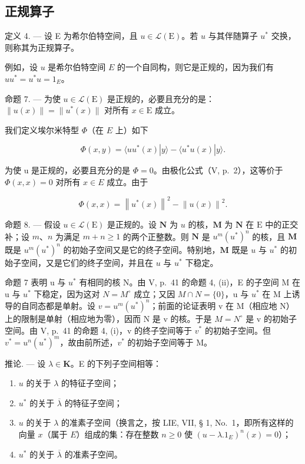 \subsection{正规算子}

定义 4. --- 设 E 为希尔伯特空间，且 \(u \in \mathcal{L}(\mathrm{E})\)。若 \(u\) 与其伴随算子 \(u^{*}\) 交换，则称其为正规算子。

例如，设 \(u\) 是希尔伯特空间 \(E\) 的一个自同构，则它是正规的，因为我们有 \(uu^{*} = u^{*}u = 1_{E}\)。

命题 7. --- 为使 \(u \in \mathcal{L}(\mathrm{E})\) 是正规的，必要且充分的是：\(\| u(x) \| = \| u^{*}(x) \|\) 对所有 \(x \in \mathrm{E}\) 成立。

我们定义埃尔米特型 \(\Phi\)（在 \(E\) 上）如下

\[
\Phi (x, y) = \langle u u ^ {*} (x) | y \rangle - \langle u ^ {*} u (x) | y \rangle .
\]

为使 u 是正规的，必要且充分的是 \(\Phi = 0\)。由极化公式（V, p.~2），这等价于 \(\Phi(x, x) = 0\) 对所有 \(x \in E\) 成立。由于

\[
\Phi (x, x) = \left\| u ^ {*} (x) \right\| ^ {2} - \left\| u (x) \right\| ^ {2}.
\]

命题 8. --- 假设 \(u \in \mathcal{L}(\mathrm{E})\) 是正规的。设 \(\mathbf{N}\) 为 \(u\) 的核，\(\mathbf{M}\) 为 \(\mathbf{N}\) 在 \(\mathrm{E}\) 中的正交补；设 \(m\)、\(n\) 为满足 \(m + n \geqslant 1\) 的两个正整数。则 \(\mathbf{N}\) 是 \(u^{m}(u^{*})^{n}\) 的核，且 \(\mathbf{M}\) 既是 \(u^{m}(u^{*})^{n}\) 的初始子空间又是它的终子空间。特别地，\(\mathbf{M}\) 既是 \(u\) 与 \(u^{*}\) 的初始子空间，又是它们的终子空间，并且在 \(u\) 与 \(u^{*}\) 下稳定。

命题 7 表明 u 与 \(u^{*}\) 有相同的核 N。由 V, p.~41 的命题 4, (ii)，E 的子空间 M 在 u 与 \(u^{*}\) 下稳定，因为这对 \(N = M^{\circ}\) 成立；又因 \(M \cap N = \{0\}\)，u 与 \(u^{*}\) 在 M 上诱导的自同态都是单射。设 \(v = u^{m}(u^{*})^{n}\)；前面的论证表明 v 在 M（相应地 N）上的限制是单射（相应地为零），因而 N 是 v 的核。于是 \(M = N^{\circ}\) 是 v 的初始子空间。由 V, p.~41 的命题 4, (i)，v 的终子空间等于 \(v^{*}\) 的初始子空间。但 \(v^{*} = u^{n}(u^{*})^{m}\)，故由前所述，\(v^{*}\) 的初始子空间等于 M。

推论. --- 设 \(\lambda \in \mathbf{K}\)。E 的下列子空间相等：

\begin{enumerate}
\def\labelenumi{\alph{enumi})}
\item
  \(u\) 的关于 \(\lambda\) 的特征子空间；
\item
  \(u^{*}\) 的关于 \(\overline{\lambda}\) 的特征子空间；
\item
  \(u\) 的关于 \(\lambda\) 的准素子空间（换言之，按 LIE, VII, § 1, No.~1，即所有这样的向量 \(x\)（属于 \(E\)）组成的集：存在整数 \(n \geqslant 0\) 使 \((u - \lambda .1_{E})^{n}(x) = 0\)）；
\item
  \(u^{*}\) 的关于 \(\overline{\lambda}\) 的准素子空间。
\end{enumerate}

